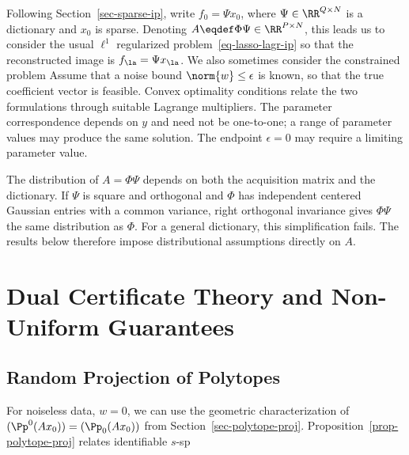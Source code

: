 Following Section~\ref{sec-sparse-ip}, write $f_0=\Psi x_0$, where $\Psi\in\RR^{Q\times N}$ is a dictionary and $x_0$ is sparse. Denoting $A\eqdef\Phi\Psi\in\RR^{P\times N}$, this leads us to consider the usual $\ell^1$ regularized problem~\eqref{eq-lasso-lagr-ip}
so that the reconstructed image is $f_\la = \Psi x_\la$. We also sometimes consider the constrained problem
Assume that a noise bound $\norm{w}\leq\epsilon$ is known, so that the true coefficient vector is feasible. Convex optimality conditions relate the two formulations through suitable Lagrange multipliers. The parameter correspondence depends on $y$ and need not be one-to-one; a range of parameter values may produce the same solution. The endpoint $\epsilon=0$ may require a limiting parameter value.

The distribution of $A=\Phi\Psi$ depends on both the acquisition matrix and the dictionary. If $\Psi$ is square and orthogonal and $\Phi$ has independent centered Gaussian entries with a common variance, right orthogonal invariance gives $\Phi\Psi$ the same distribution as $\Phi$. For a general dictionary, this simplification fails. The results below therefore impose distributional assumptions directly on $A$.

                                    
                                    
                                    
\section{Dual Certificate Theory and Non-Uniform Guarantees}
\label{sec-cs-certif}

                                    
\subsection{Random Projection of Polytopes}

For noiseless data, $w=0$, we can use the geometric characterization of $(\Pp^0(Ax_0))=(\Pp_0(Ax_0))$ from Section~\ref{sec-polytope-proj}. Proposition~\ref{prop-polytope-proj} relates identifiable $s$-sp